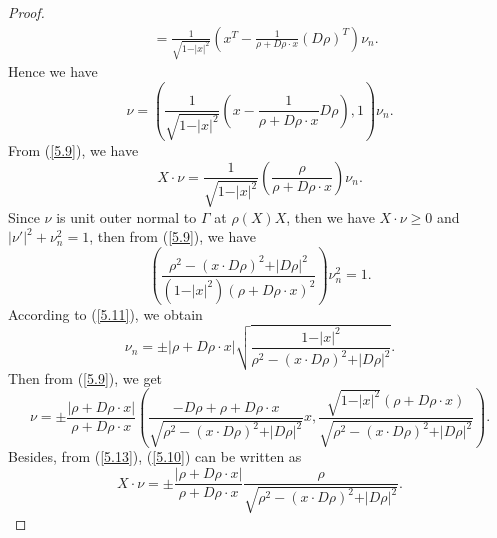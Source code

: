 \documentclass[10pt,a4paper]{amsart}
\begin{document}
\begin{proof}
\begin{align*}
     & = \frac{1}{\sqrt{1 - \vert x \vert^{2}}}\left(x^{T} - \frac{1}{\rho + D\rho \cdot x}(D\rho)^{T}\right)\nu_{n}.
  \end{align*}
  Hence we have
  \begin{equation}\label{5.9}
    \nu = \left(\frac{1}{\sqrt{1 - \vert x \vert^{2}}}\left(x - \frac{1}{\rho + D\rho \cdot x}D\rho\right),1\right)\nu_{n}.
  \end{equation}
  From (\ref{5.9}), we have
  \begin{equation}\label{5.10}
    X\cdot \nu = \frac{1}{\sqrt{1 - \vert x \vert^{2}}}\left(\frac{\rho}{\rho + D\rho \cdot x}\right)\nu_{n}.
  \end{equation}
  Since $\nu$ is unit outer normal to $\Gamma$ at $\rho(X)X$, then we have $X\cdot \nu \geq 0$ and $\vert \nu' \vert^{2} + \nu_{n}^{2} = 1$, then from (\ref{5.9}), we have
  \begin{equation}\label{5.11}
    \left(\frac{\rho^{2} - (x \cdot D\rho)^{2} + \vert D\rho \vert^{2}}{(1 - \vert x \vert^{2})(\rho + D\rho \cdot x)^{2}}\right)\nu_{n}^{2} = 1.
  \end{equation}
  According to (\ref{5.11}), we obtain
  \begin{equation}\label{5.12}
    \nu_{n} = \pm \vert \rho + D\rho \cdot x \vert\sqrt{\frac{1-\vert x \vert^{2}}{\rho^{2} - (x \cdot D\rho)^{2} + \vert D\rho \vert^{2}}}.
  \end{equation}
  Then from (\ref{5.9}), we get
  \begin{equation}\label{5.13}
    \nu = \pm \frac{\vert \rho + D\rho \cdot x \vert}{\rho + D\rho \cdot x}\left(\frac{-D\rho +\rho + D\rho \cdot x}{\sqrt{\rho^{2} - (x \cdot D\rho)^{2} + \vert D\rho \vert^{2}}}x,\frac{\sqrt{1 - \vert x \vert^{2}}(\rho + D\rho \cdot x)}{\sqrt{\rho^{2} - (x \cdot D\rho)^{2} + \vert D\rho \vert^{2}}}\right).
  \end{equation}
  Besides, from (\ref{5.13}), (\ref{5.10}) can be written as
  \begin{equation*}
    X\cdot \nu = \pm \frac{\vert \rho + D\rho \cdot x \vert}{\rho + D\rho \cdot x}\frac{\rho}{\sqrt{\rho^{2} - (x \cdot D\rho)^{2} + \vert D\rho \vert^{2}}}.
  \end{equation*}


\end{proof}
\end{document}
